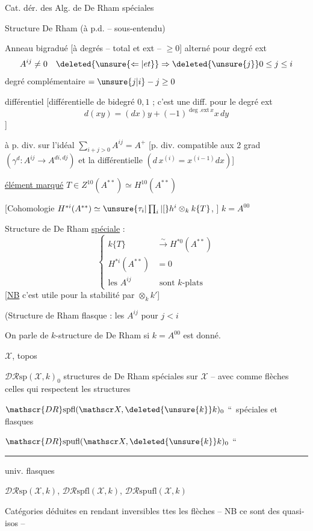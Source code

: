  Cat. dér. des Alg. de De Rham spéciales

Structure De Rham (à p.d. -- sous-entendu)

Anneau bigradué [à degrés -- total et ext -- $\geq 0$] alterné pour degré ext
\[
 A^{ij}\ne 0\quad\deleted{\unsure{\Leftarrow|et}}\Rightarrow
 \deleted{\unsure{j}}0\leq j\leq i
\]
degré complémentaire $=\unsure{j|i}-j\geq 0$

différentiel [différentielle de bidegré $0,1$ ; c'est une diff. pour le degré ext 
\[
d(xy)=(dx)y+(-1)^{\deg.\mathrm{ext}\,x}x\,dy
\]
]

à p. div. sur l'idéal $\displaystyle\sum_{i+j>0} A^{ij}=A^+$ [p. div.  compatible aux 2 grad  $(\gamma^d:A^{ij}\longrightarrow A^{di,dj})$ et la différentielle $(d\,x^{(i)}=x^{(i-1)}dx)$]

\uline{élément marqué} $T\in Z^{10}(A^{**})\simeq H^{10}(A^{**})$

[Cohomologie $H^{*i}(A^{**})\simeq\unsure{\tau_i|\prod_i|[}h^i\otimes_k k\{T\}$, ] $k=A^{00}$

Structure de De Rham \uline{spéciale} :
\[
\left\{\begin{aligned}
k\{T\}&\xrightarrow{\sim}H^{*0}(A^{**})\\
H^{*i}(A^{**})&=0\\
\text{les } A^{ij}&\text{ sont }k\text{-plats}
\end{aligned}\right.
\]
[\uline{NB} c'est utile pour la stabilité par $\otimes_k k'$]

(Structure de  Rham flasque : les $A^{ij}$ pour $j<i$ 

On parle de $k$-structure de De Rham si $k=A^{00}$ est donné.

 $\mathscr X$, topos

 $\mathscr{DR}\mathrm{sp}(\mathscr X,k)_0$ structures de De Rham spéciales sur $\mathscr X$ -- avec comme flèches celles qui respectent  les structures 

$\mathscr{DR}\mathrm{spfl}(\mathscr X,\deleted{\unsure{k}}k)_0$ \textquotedblleft\ spéciales et flasques

$\mathscr{DR}\mathrm{spufl}(\mathscr X,\deleted{\unsure{k}}k)_0$ \textquotedblleft\ \rule{1.5cm}{0.4pt} univ. flasques

$\mathscr{DR}\mathrm{sp}(\mathscr X,k)$, $\mathscr{DR}\mathrm{spfl}(\mathscr X,k)$, $\mathscr{DR}\mathrm{spufl}(\mathscr X,k)$

Catégories  déduites en rendant inversibles ttes les flèches -- NB ce sont des quasi-isos --

